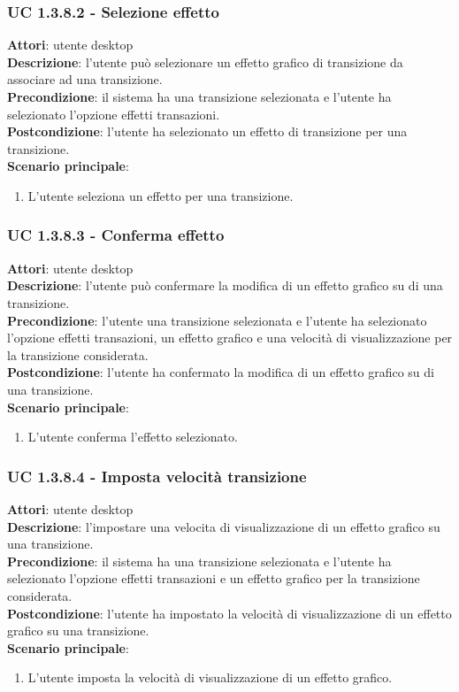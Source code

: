 \subsubsection{UC 1.3.8.2 - Selezione effetto}{
	\label{uc1.3.8.2}
	\textbf{Attori}: utente desktop \\
	\textbf{Descrizione}: l'utente può selezionare un effetto grafico di transizione da associare ad una transizione. \\
	\textbf{Precondizione}: il sistema ha una transizione selezionata e l'utente ha selezionato l'opzione effetti transazioni.	\\
	\textbf{Postcondizione}: l'utente ha selezionato un effetto di transizione per una transizione.	\\
	\textbf{Scenario principale}:
	\begin{enumerate}
		\item L'utente seleziona un effetto per una transizione.
	\end{enumerate}
}
\subsubsection{UC 1.3.8.3 - Conferma effetto}{
	\label{uc1.3.8.3}
	\textbf{Attori}: utente desktop \\
	\textbf{Descrizione}: l'utente può confermare la modifica di un effetto grafico su di una transizione. \\
	\textbf{Precondizione}: l'utente una transizione selezionata e l'utente ha selezionato l'opzione effetti transazioni, un effetto grafico e una velocità di visualizzazione per la transizione considerata.	\\
	\textbf{Postcondizione}: l'utente ha confermato la modifica di un effetto grafico su di una transizione.\\
	\textbf{Scenario principale}:
	\begin{enumerate}
		\item L'utente conferma l'effetto selezionato.
	\end{enumerate}
}
\subsubsection{UC 1.3.8.4 - Imposta velocità transizione}{
	\label{uc1.3..8.4}
	\textbf{Attori}: utente desktop \\
	\textbf{Descrizione}: l'impostare una velocita di visualizzazione di un effetto grafico su una transizione. \\
	\textbf{Precondizione}: il sistema ha una transizione selezionata e l'utente ha selezionato l'opzione effetti transazioni e un effetto grafico per la transizione considerata.	\\
	\textbf{Postcondizione}: l'utente ha impostato la velocità di visualizzazione di un effetto grafico su una transizione.\\
	\textbf{Scenario principale}:
	\begin{enumerate}
		\item L'utente imposta la velocità di visualizzazione di un effetto grafico.
	\end{enumerate}
}
